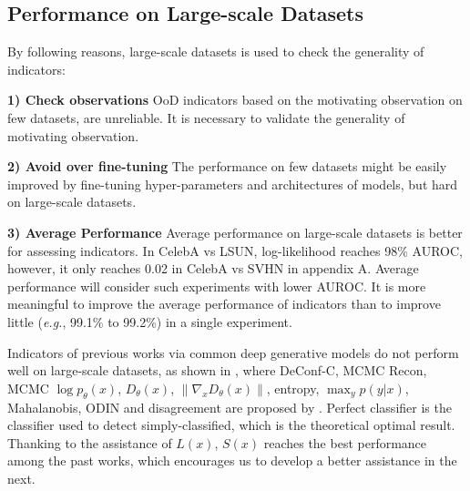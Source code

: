 \documentclass[letterpaper]{article} %
\newcommand{\EG}{\textit{e.g.}, }
\newcommand{\pin}{p_{in}}
\newcommand{\pout}{p_{out}}
\begin{document}
\subsection{Performance on Large-scale Datasets}

By following reasons, large-scale datasets is used to check the generality of indicators:

\noindent \textbf{1) Check observations} OoD indicators based on the motivating observation on few datasets, are unreliable. It is necessary to validate the generality of motivating observation. 

\noindent \textbf{2) Avoid over fine-tuning} The performance on few datasets might be easily improved by fine-tuning hyper-parameters and architectures of models, but hard on large-scale datasets. 


\noindent \textbf{3) Average Performance} Average performance on large-scale datasets is better for assessing indicators. In CelebA vs LSUN, log-likelihood reaches 98\% AUROC, however, it only reaches 0.02 in CelebA vs SVHN in appendix A. Average performance will consider such experiments with lower AUROC. It is more meaningful to improve the average performance of indicators than to improve little (\EG 99.1\% to 99.2\%) in a single experiment. 

Indicators of previous works via common deep generative models do not perform well on large-scale datasets, as shown in , where
DeConf-C, MCMC Recon, MCMC $\log p_\theta(x)$, $D_\theta(x)$, $\|\nabla_x D_\theta(x)\|$, entropy, $\max_{y} p(y|x)$, Mahalanobis, ODIN and disagreement are proposed by \cite{hendrycks2016baseline,hsu2020generalized,lee2018simple,alemi2018uncertainty,liang2018enhancing,kumar2019maximum,xu2018unsupervised,chen2019unsupervised,lakshminarayanan2017simple}. Perfect classifier is the classifier used to detect simply-classified, which is the theoretical optimal result. 
Thanking to the assistance of $L(x)$, $S(x)$ reaches the best performance among the past works, which encourages us to develop a better assistance in the next. 
\end{document}
